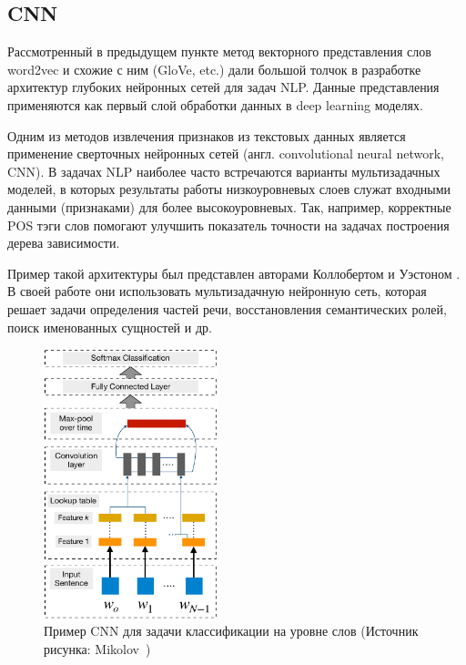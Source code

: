 \subsection{CNN}
Рассмотренный в предыдущем пункте метод векторного представления слов word2vec и схожие с ним (GloVe, etc.) дали большой толчок в разработке архитектур глубоких нейронных сетей для задач NLP. Данные представления применяются  как первый слой обработки данных в deep learning моделях. 

Одним из методов извлечения признаков из текстовых данных является применение сверточных нейронных сетей (англ. convolutional neural network, CNN).
В задачах NLP наиболее часто встречаются варианты мультизадачных моделей, в которых результаты работы низкоуровневых слоев служат входными данными (признаками) для более высокоуровневых. Так, например, корректные POS тэги слов помогают улучшить показатель точности на задачах построения дерева зависимости. 

Пример такой архитектуры был представлен авторами Коллобертом и Уэстоном \autocite{DBLP:journals/corr/abs-1103-0398}. В своей работе они использовать мультизадачную нейронную сеть, которая решает задачи определения частей речи, восстановления семантических ролей, поиск именованных сущностей и др. 

\begin{figure}[t]

\centering
\includegraphics[width=0.45\textwidth]{img/collobertCNN.pdf}
\caption{\label{fig:collobertCNN}Пример CNN для задачи классификации на уровне слов (Источник рисунка: Mikolov~\autocite{DBLP:journals/corr/abs-1103-0398})}
\end{figure}


